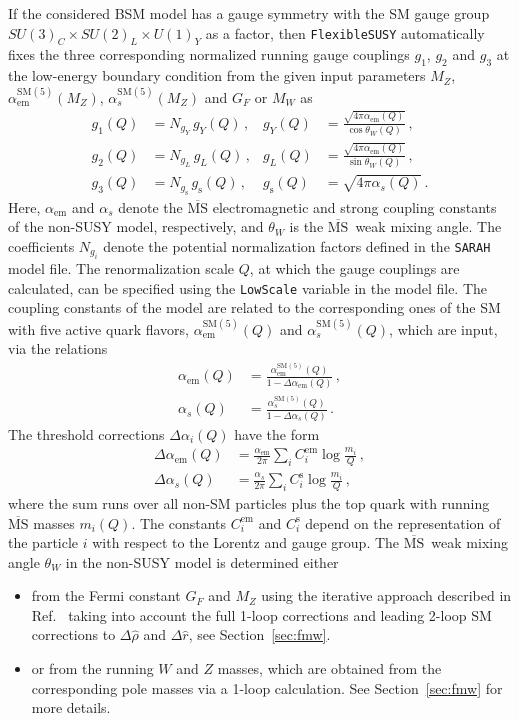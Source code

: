 \documentclass[final,3p,11pt,pdflatex]{elsarticle}
\makeatletter
\newcommand{\sarah}{\texttt{SARAH}\@\xspace}
\newcommand{\fs}{\texttt{FlexibleSUSY}\@\xspace}
\newcommand{\code}[1]{\lstinline|#1|}  %
\newcommand{\ol}[1]{\overline{#1}}
\newcommand{\MSbar}{\ensuremath{\ol{\text{MS}}}\xspace}
\newcommand{\SM}{\ensuremath{\text{SM}}\xspace}
\newcommand{\secref}[1]{Section~\ref{#1}}
\def\as{\alpha_s}
\def\aem{\alpha_{\text{em}}}
\makeatother
\begin{document}
If the considered BSM model has a gauge symmetry with the SM gauge group $SU(3)_C\times SU(2)_L\times U(1)_Y$ as a factor,
then \fs automatically fixes the three corresponding normalized running gauge
couplings $g_1$, $g_2$ and $g_3$ at the low-energy boundary condition
from the given input parameters $M_Z$, $\aem^{\SM(5)}(M_Z)$,
$\as^{\SM(5)}(M_Z)$ and $G_F$ or $M_W$ as
%
\begin{align}
  g_1(Q) &= N_{g_Y} \, g_Y(Q) \,,
  & g_Y(Q) &= \frac{\sqrt{4\pi\aem(Q)}}{\cos\theta_W(Q)} \,,\\
  g_2(Q) &= N_{g_L} \, g_L(Q) \,,
  & g_L(Q) &= \frac{\sqrt{4\pi\aem(Q)}}{\sin\theta_W(Q)} \,,\\
  g_3(Q) &= N_{g_{\text{s}}} \, g_{\text{s}}(Q) \,,
  & g_{\text{s}}(Q) &= \sqrt{4\pi\as(Q)} \,.
\end{align}
%
Here, $\aem$ and $\as$
denote the \MSbar electromagnetic and strong coupling constants of the
non-SUSY model, respectively, and $\theta_W$ is the \MSbar\ weak
mixing angle.  The coefficients $N_{g_i}$ denote the potential
normalization factors defined in the \sarah model file.  The
renormalization scale $Q$, at which the gauge couplings are calculated,
can be specified using the \code{LowScale} variable in the model file.
The coupling constants of the model are related to the corresponding
ones of the SM with five active quark flavors,
$\aem^{\SM(5)}(Q)$ and $\as^{\SM(5)}(Q)$, which are input,
via the relations
%
\begin{align}
  \aem(Q) &=
  \frac{\aem^{\SM(5)}(Q)}{1 - \Delta\aem(Q)} \,,\\
  \as(Q) &=
  \frac{\as^{\SM(5)}(Q)}{1 - \Delta\as(Q)} \,.
\end{align}
%
The threshold corrections $\Delta\alpha_i(Q)$ have the form
%
\begin{align}
  \Delta\aem(Q) &=
  \frac{\aem}{2\pi} \sum_i C_i^{\text{em}} \log\frac{m_i}{Q}
  \,,\label{eq:alpha_em_general_threshold} \\
  \Delta\as(Q) &=
  \frac{\as}{2\pi} \sum_i C_i^{\text{s}} \log\frac{m_i}{Q} \,,
\end{align}
%
where the sum runs over all non-SM particles plus the top quark
with running \MSbar masses $m_i(Q)$.
The constants $C_i^{\text{em}}$ and $C_i^{\text{s}}$ depend on the
representation of the particle $i$ with respect to the Lorentz and gauge group.
%
The \MSbar\ weak mixing angle $\theta_W$ in the non-SUSY model is
determined either
%
\begin{itemize}
\item from the Fermi constant $G_F$ and $M_Z$ using the iterative
  approach described in Ref.~\cite{Degrassi:1990tu} taking into account the
  full 1-loop corrections and leading 2-loop SM
  corrections to $\Delta\hat{\rho}$ and $\Delta\hat{r}$, see
  \secref{sec:fmw}.
\item or from the running $W$ and $Z$ masses, which
  are obtained from the corresponding pole masses via a 1-loop
  calculation.  See \secref{sec:fmw} for more details.
\end{itemize}
\end{document}
